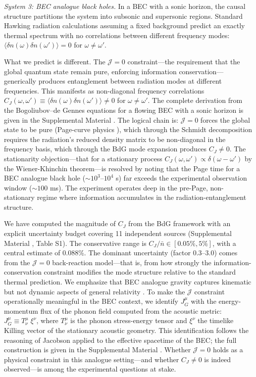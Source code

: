 \documentclass[aps,prd,reprint,superscriptaddress,twocolumn]{revtex4-2}
\begin{document}
\textit{System 3: BEC analogue black holes.} In a BEC with a sonic horizon, the causal structure partitions the system into subsonic and supersonic regions. Standard Hawking radiation calculations assuming a fixed background predict an exactly thermal spectrum with no correlations between different frequency modes: $\langle \delta n(\omega) \delta n(\omega') \rangle = 0$ for $\omega \neq \omega'$.

What we predict is different. The $\mathcal{J} = 0$ constraint---the requirement that the global quantum state remain pure, enforcing information conservation---generically produces entanglement between radiation modes at different frequencies. This manifests as non-diagonal frequency correlations $C_J(\omega,\omega') \equiv \langle \delta n(\omega) \delta n(\omega') \rangle \neq 0$ for $\omega \neq \omega'$. The complete derivation from the Bogoliubov--de Gennes equations for a flowing BEC with a sonic horizon is given in the Supplemental Material \cite{SM}. The logical chain is: $\mathcal{J}=0$ forces the global state to be pure (Page-curve physics \cite{Page1993,HaydenPreskill2007}), which through the Schmidt decomposition requires the radiation's reduced density matrix to be non-diagonal in the frequency basis, which through the BdG mode expansion produces $C_J \neq 0$. The stationarity objection---that for a stationary process $C_J(\omega,\omega') \propto \delta(\omega-\omega')$ by the Wiener-Khinchin theorem---is resolved by noting that the Page time for a BEC analogue black hole ($\sim 10^3$--$10^4$ s) far exceeds the experimental observation window ($\sim 100$ ms). The experiment operates deep in the pre-Page, non-stationary regime where information accumulates in the radiation-entanglement structure.

We have computed the magnitude of $C_J$ from the BdG framework with an explicit uncertainty budget covering 11 independent sources (Supplemental Material \cite{SM}, Table S1). The conservative range is $C_J/\bar{n} \in [0.05\%, 5\%]$, with a central estimate of 0.088\%. The dominant uncertainty (factor 0.3--3.0) comes from the $\mathcal{J}=0$ back-reaction model---that is, from how strongly the information-conservation constraint modifies the mode structure relative to the standard thermal prediction. We emphasize that BEC analogue gravity captures kinematic but not dynamic aspects of general relativity \cite{BarceloLiberatiVisser2011}. To make the $\mathcal{J}$ constraint operationally meaningful in the BEC context, we identify $J^\mu_G$ with the energy-momentum flux of the phonon field computed from the acoustic metric: $J^\mu_G \equiv T^\mu_\nu\; \xi^\nu$, where $T^\mu_\nu$ is the phonon stress-energy tensor and $\xi^\nu$ the timelike Killing vector of the stationary acoustic geometry. This identification follows the reasoning of Jacobson \cite{Jacobson1995} applied to the effective spacetime of the BEC; the full construction is given in the Supplemental Material \cite{SM}. Whether $\mathcal{J}=0$ holds as a physical constraint in this analogue setting---and whether $C_J\neq 0$ is indeed observed---is among the experimental questions at stake.
\end{document}
